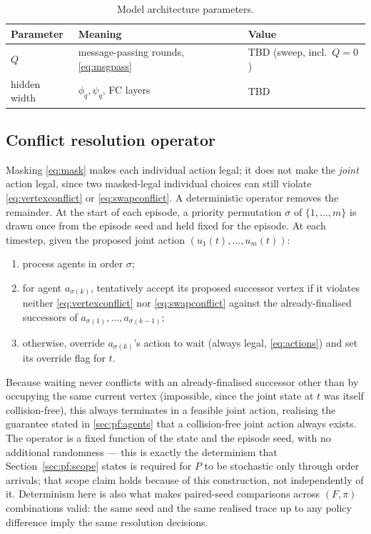 \documentclass[../main.tex]{subfiles}
\begin{document}
\begin{table}[h]
  \centering
  \caption{Model architecture parameters.}
  \label{tab:modelparams}
  \begin{tabular}{lll}
    \toprule
    Parameter & Meaning & Value \\
    \midrule
    $Q$ & message-passing rounds, \eqref{eq:msgpass} & TBD (sweep, incl.\ $Q=0$) \\
    hidden width & $\phi_q,\psi_q$, FC layers & TBD \\
    \bottomrule
  \end{tabular}
\end{table}

\subsection{Conflict resolution operator}
\label{sec:method:resolution}

Masking \eqref{eq:mask} makes each individual action legal; it does not make
the \emph{joint} action legal, since two masked-legal individual choices can
still violate \eqref{eq:vertexconflict} or \eqref{eq:swapconflict}. A
deterministic operator removes the remainder. At the start of each episode, a
priority permutation $\sigma$ of $\{1,\dots,m\}$ is drawn once from the
episode seed and held fixed for the episode. At each timestep, given the
proposed joint action $(u_1(t),\dots,u_m(t))$:
\begin{enumerate}
  \item process agents in order $\sigma$;
  \item for agent $a_{\sigma(k)}$, tentatively accept its proposed successor
    vertex if it violates neither \eqref{eq:vertexconflict} nor
    \eqref{eq:swapconflict} against the already-finalised successors of
    $a_{\sigma(1)},\dots,a_{\sigma(k-1)}$;
  \item otherwise, override $a_{\sigma(k)}$'s action to $\mathrm{wait}$
    (always legal, \eqref{eq:actions}) and set its override flag for $t$.
\end{enumerate}
Because waiting never conflicts with an already-finalised successor other
than by occupying the same current vertex (impossible, since the joint state
at $t$ was itself collision-free), this always terminates in a feasible joint
action, realising the guarantee stated in \ref{sec:pf:agents} that a
collision-free joint action always exists. The operator is a fixed function
of the state and the episode seed, with no additional randomness --- this is
exactly the determinism that Section~\ref{sec:pf:scope} states is required
for $P$ to be stochastic only through order arrivals; that scope claim holds
because of this construction, not independently of it. Determinism here is
also what makes paired-seed comparisons across $(F,\pi)$ combinations valid:
the same seed and the same realised trace up to any policy difference imply
the same resolution decisions.
\end{document}
